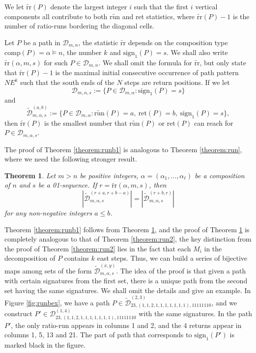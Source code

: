 \documentclass[11pt,a4paper,reqno]{article}
\newtheorem{thm}{Theorem}[section]
\newcommand{\tref}[1]{Theorem \ref{theorem:#1}}
\newcommand{\fref}[1]{Figure \ref{fig:#1}}
\newcommand{\DD}{\mathcal{D}}
\newcommand{\runb}{\widetilde{{\mathrm{run}}}}
\newcommand{\trr}{\widetilde{\mathrm{rr}}}
\newcommand{\signa}{\mathrm{sign}_1}
\newcommand{\tDD}{\widetilde{\mathcal{D}}}
\newcommand{\ret}{\mathrm{ret}}
\newcommand{\al}{\alpha}
\newcommand{\comp}{\mathrm{comp}}
\begin{document}
{    
	We let $\trr(P)$ denote the largest integer $i$ such that the first $i$ vertical components all contribute to both $\runb$ and ret statistics, where $\trr(P)-1$ is the number of ratio-runs bordering the diagonal cells.
	
	Let $P$ be a path in $\DD_{m,n}$, the statistic $\trr$ depends on the composition type $\comp(P)=\al\vDash n$, the number $k$ and $\signa(P)=s$. We shall also write $\trr(\al,m,s)$ for such $P\in\DD_{m,n}$.
	We shall omit the formula for $\trr$, but only state that $\trr(P)-1$ is the maximal initial consecutive occurrence of path pattern $NE^k$ such that the south ends of the $N$ steps are return positions.
	If we let
	$$\DD_{m,\al, s}:=\{P\in \DD_{m,\al}: \signa(P)=s\}$$
	and
	$$\tDD_{m,\al, s}^{(a,b)}:=\{P\in \DD_{m,\al}: \runb(P)=a,\ \ret(P)=b,\ \signa(P)=s\},$$
	then $\trr(P)$ is the smallest number that $\runb(P)$ or $\ret(P)$ can reach for $P\in\DD_{m,\al, s}$.
	
	
	The proof of \tref{runb1} is analogous to \tref{run}, where we need the following stronger result.
	\begin{thm}\label{theorem:runb2}
		Let $m>n$ be positive integers, $\al = (\al_1,\ldots,\al_\ell)$ be a composition of $n$ and $s$ be a 01-sequence. If $r=\trr(\al,m,s)$, then
		\begin{equation}\label{runbthm}
			\left|\tDD_{m,\al,s}^{(r+a,r+b-a)}\right| = \left|\tDD_{m,\al,s}^{(r+b,r)}\right|
		\end{equation}
		for any non-negative integers $a\leq b$.
	\end{thm}
    
	\tref{runb1} follows from \tref{runb2}, and the proof of \tref{runb2} is completely analogous to that of \tref{run2}, {the key distinction from the proof of \tref{run2} lies in the fact that each $M_i$ in the decomposition of $P$ contains $k$ east steps}. Thus, we can build a series of bijective maps among sets of the form $\tDD_{m,\al,s}^{(x,y)}$. The idea of the proof is that given a path with certain signatures from the first set, there is a unique path from the second set having the same signatures.
    We shall omit the details and give an example. In \fref{runbex}, we have a path $P\in\tDD_{23,(1,1,2,1,1,1,1,1,1,1),11111110}^{(2,3)}$, and we construct $P'\in\DD_{23,(1,1,2,1,1,1,1,1,1,1),11111110}^{(1,4)}$ with the same signatures. In the path $P'$, the only ratio-run appears in columns 1 and 2, and the 4 returns appear in columns 1, 5, 13 and 21. The part of path that corresponds to $\signa(P')$ is marked black in the figure.
	
}
\end{document}
